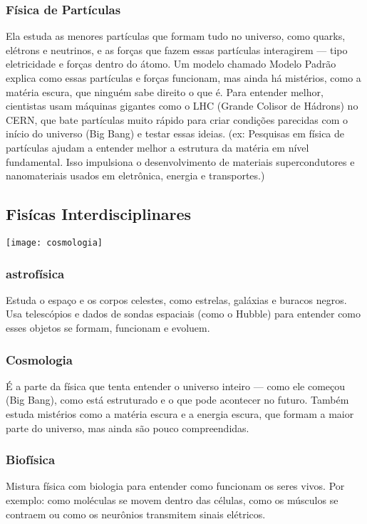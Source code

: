 \documentclass[portuguese,11pt,a4paper,oneside,openany,notitlepage]{article}
\begin{document}
	\subsubsection{Física de Partículas}
	Ela estuda as menores partículas que formam tudo no universo, como quarks, elétrons e neutrinos, e as forças que fazem essas partículas interagirem — tipo eletricidade e forças dentro do átomo.
	Um modelo chamado Modelo Padrão explica como essas partículas e forças funcionam, mas ainda há mistérios, como a matéria escura, que ninguém sabe direito o que é.
	Para entender melhor, cientistas usam máquinas gigantes como o LHC (Grande Colisor de Hádrons) no CERN, que bate partículas muito rápido para criar condições parecidas com o início do universo (Big Bang) e testar essas ideias. \newline (ex: Pesquisas em física de partículas ajudam a entender melhor a estrutura da matéria em nível fundamental. Isso impulsiona o desenvolvimento de materiais supercondutores e nanomateriais usados em eletrônica, energia e transportes.)
	
	\subsection{Fisícas Interdisciplinares}
	
	\begin{center}
		\texttt{[image: cosmologia]}
	\end{center}
	
	\subsubsection{astrofísica}
	Estuda o espaço e os corpos celestes, como estrelas, galáxias e buracos negros. Usa telescópios e dados de sondas espaciais (como o Hubble) para entender como esses objetos se formam, funcionam e evoluem.
	
	\subsubsection{Cosmologia}
	É a parte da física que tenta entender o universo inteiro — como ele começou (Big Bang), como está estruturado e o que pode acontecer no futuro. Também estuda mistérios como a matéria escura e a energia escura, que formam a maior parte do universo, mas ainda são pouco compreendidas.
	
	\subsubsection{Biofísica}
	Mistura física com biologia para entender como funcionam os seres vivos. Por exemplo: como moléculas se movem dentro das células, como os músculos se contraem ou como os neurônios transmitem sinais elétricos.
	
\end{document}
